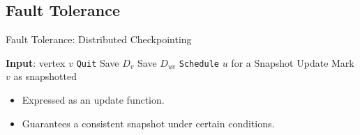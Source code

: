 \documentclass[onlymath,xcolor=pdftex,dvipsnames,table]{beamer}
\theoremstyle{remark} %
\begin{document}
\subsection{Fault Tolerance}
\begin{frame}{Fault Tolerance: Distributed Checkpointing}
\begin{algorithm}[H]\footnotesize
  \caption{Chandy-Lamport Distributed Snap-Shot}
  \begin{algorithmic}
    \State\textbf{Input}: vertex $v$
      \State \texttt{Quit}
    \EndIf
    \State Save $D_v$ 
        \State Save $D_{uv}$
        \State \texttt{Schedule} $u$ for a Snapshot Update
      \EndIf
    \EndFor
    \State Mark $v$ as snapshotted
  \end{algorithmic}
\end{algorithm}
\begin{itemize}
\item Expressed as an update function.
\item Guarantees a consistent snapshot under certain conditions.
\end{itemize}
\end{frame}

\end{document}
